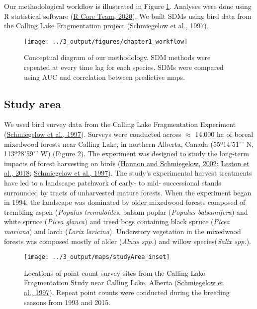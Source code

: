 \documentclass[
  12pt,
]{article}
\begin{document}
Our methodological workflow is illustrated in Figure \ref{fig:2workflow}. Analyses were done using R statistical software (\protect\hyperlink{ref-R-base}{R Core Team, 2020}). We built SDMs using bird data from the Calling Lake Fragmentation project (\protect\hyperlink{ref-Schmiegelow1997}{Schmiegelow et al., 1997}).

\begin{figure}[htb]
\texttt{[image: ../3\_output/figures/chapter1\_workflow]} \caption{Conceptual diagram of our methodology. SDM methods were repeated at every time lag for each species. SDMs were compared using AUC and correlation between predictive maps.}\label{fig:2workflow}
\end{figure}

\hypertarget{study-area}{%
\subsection{Study area}\label{study-area}}

We used bird survey data from the Calling Lake Fragmentation Experiment (\protect\hyperlink{ref-Schmiegelow1997}{Schmiegelow et al., 1997}). Surveys were conducted across \(\approx\) 14,000 ha of boreal mixedwood forests near Calling Lake, in northern Alberta, Canada (55º14'51'\,' N, 113º28'59'\,' W) (Figure \ref{fig:2studyArea}). The experiment was designed to study the long-term impacts of forest harvesting on birds (\protect\hyperlink{ref-hannonCorridorsMayNot2002}{Hannon and Schmiegelow, 2002}; \protect\hyperlink{ref-lestonLongtermChangesBoreal2018}{Leston et al., 2018}; \protect\hyperlink{ref-Schmiegelow1997}{Schmiegelow et al., 1997}). The study's experimental harvest treatments have led to a landscape patchwork of early- to mid- successional stands surrounded by tracts of unharvested mature forests. When the experiment began in 1994, the landscape was dominated by older mixedwood forests composed of trembling aspen (\emph{Populus tremuloides}, balsam poplar (\emph{Populus balsamifera}) and white spruce (\emph{Picea glauca}) and treed bogs containing black spruce (\emph{Picea mariana}) and larch (\emph{Larix laricina}). Understory vegetation in the mixedwood forests was composed mostly of alder (\emph{Alnus spp.}) and willow species(\emph{Salix spp.}).


\begin{figure}[htb]
\texttt{[image: ../3\_output/maps/studyArea\_inset]} \caption{Locations of point count survey sites from the Calling Lake Fragmentation Study near Calling Lake, Alberta (\protect\hyperlink{ref-Schmiegelow1997}{Schmiegelow et al., 1997}). Repeat point counts were conducted during the breeding seasons from 1993 and 2015.}\label{fig:2studyArea}
\end{figure}
\end{document}
